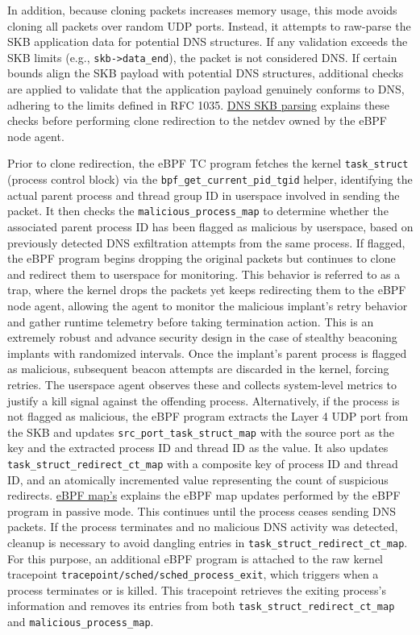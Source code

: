 \documentclass [11pt, proquest] {uwthesis}[2020/02/24]
\begin{document}
In addition, because cloning packets increases memory usage, this mode avoids cloning all packets over random UDP ports. Instead, it attempts to raw-parse the SKB application data for potential DNS structures. If any validation exceeds the SKB limits (e.g., \texttt{skb->data\_end}), the packet is not considered DNS. If certain bounds align the SKB payload with potential DNS structures, additional checks are applied to validate that the application payload genuinely conforms to DNS, adhering to the limits defined in RFC 1035. \hyperref[sec:alg4]{DNS SKB parsing} explains these checks before performing clone redirection to the netdev owned by the eBPF node agent.

Prior to clone redirection, the eBPF TC program fetches the kernel \texttt{task\_struct} (process control block) via the \texttt{bpf\_get\_current\_pid\_tgid} helper, identifying the actual parent process and thread group ID in userspace involved in sending the packet. It then checks the \texttt{malicious\_process\_map} to determine whether the associated parent process ID has been flagged as malicious by userspace, based on previously detected DNS exfiltration attempts from the same process. If flagged, the eBPF program begins dropping the original packets but continues to clone and redirect them to userspace for monitoring. This behavior is referred to as a trap, where the kernel drops the packets yet keeps redirecting them to the eBPF node agent, allowing the agent to monitor the malicious implant’s retry behavior and gather runtime telemetry before taking termination action. This is an extremely robust and advance security design in the case of stealthy beaconing implants with randomized intervals. Once the implant’s parent process is flagged as malicious, subsequent beacon attempts are discarded in the kernel, forcing retries. The userspace agent observes these and collects system-level metrics to justify a kill signal against the offending process. Alternatively, if the process is not flagged as malicious, the eBPF program extracts the Layer 4 UDP port from the SKB and updates \texttt{src\_port\_task\_struct\_map} with the source port as the key and the extracted process ID and thread ID as the value. It also updates \texttt{task\_struct\_redirect\_ct\_map} with a composite key of process ID and thread ID, and an atomically incremented value representing the count of suspicious redirects. \hyperref[sec:alg5]{eBPF map’s} explains the eBPF map updates performed by the eBPF program in passive mode.
This continues until the process ceases sending DNS packets. If the process terminates and no malicious DNS activity was detected, cleanup is necessary to avoid dangling entries in \texttt{task\_struct\_redirect\_ct\_map}. For this purpose, an additional eBPF program is attached to the raw kernel tracepoint \texttt{tracepoint/sched/sched\_process\_exit}, which triggers when a process terminates or is killed. This tracepoint retrieves the exiting process’s information and removes its entries from both \texttt{task\_struct\_redirect\_ct\_map} and \texttt{malicious\_process\_map}.
\end{document}

